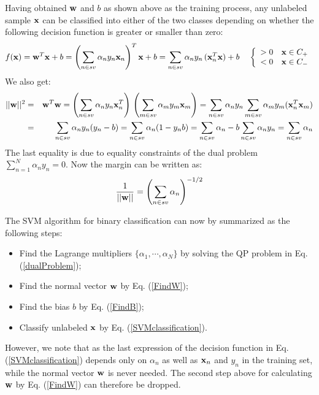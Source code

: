 \documentclass{article}
\begin{document}

Having obtained ${\bf w}$ and $b$ as shown above as the training process,
any unlabeled sample ${\bf x}$ can be classified into either of the two 
classes depending on whether the following decision function is greater 
or smaller than zero:
\begin{equation}
  f({\bf x})={\bf w}^T{\bf x}+b
  =\left(\sum_{n\in sv}\alpha_ny_n{\bf x}_n\right)^T{\bf x}+b
  =\sum_{n\in sv}\alpha_ny_n\,({\bf x}^T_n{\bf x})+b\;\;\;\;
  \left\{\begin{array}{ll}>0 & {\bf x}\in C_+\\<0 & {\bf x}\in C_-
    \end{array}\right.
  \label{SVMclassification}
\end{equation}
We also get:
\begin{eqnarray}
  ||{\bf w}||^2&=&{\bf w}^T {\bf w}
  =\left(\sum_{n\in sv} \alpha_n y_n {\bf x}^T_n\right)\,
  \left(\sum_{m\in sv} \alpha_m y_m {\bf x}_m\right)
  =\sum_{n\in sv} \alpha_n y_n \sum_{m\in sv} \alpha_m y_m ({\bf x}^T_n{\bf x}_m)
  \nonumber \\
  &=&\sum_{n\in sv} \alpha_n y_n (y_n-b)=\sum_{n\in sv} \alpha_n (1-y_n b)
  =\sum_{n\in sv} \alpha_n - b\sum_{n\in sv} \alpha_n y_n=\sum_{n\in sv} \alpha_n 
\end{eqnarray}
The last equality is due to equality constraints of the dual problem
$\sum_{n=1}^N \alpha_n y_n=0$. Now the margin can be written as:
\begin{equation}
  \frac{1}{||{\bf w}||}=\left(\sum_{n\in sv} \alpha_n\right)^{-1/2}	
\end{equation}

The SVM algorithm for binary classification can now by summarized 
as the following steps:
\begin{itemize}
\item Find the Lagrange multipliers $\{\alpha_1,\cdots,\alpha_N\}$
  by solving the QP problem in Eq. (\ref{dualProblem});  
\item Find the normal vector ${\bf w}$ by Eq. (\ref{FindW});
\item Find the bias $b$ by Eq. (\ref{FindB});
\item Classify unlabeled ${\bf x}$ by Eq. (\ref{SVMclassification}).
\end{itemize}
However, we note that as the last expression of the decision function 
in Eq. (\ref{SVMclassification}) depends only on $\alpha_n$ as well
as ${\bf x}_n$ and $y_n$ in the training set, while the normal vector
${\bf w}$ is never needed. The second step above for calculating 
${\bf w}$ by Eq. (\ref{FindW}) can therefore be dropped.
\end{document}
